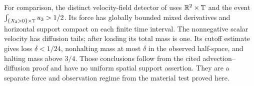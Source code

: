 \begin{remark}
For comparison, the distinct velocity-field detector of
\cite[Theorem~1.1(2) and Section~5]{OpenAI379EulerianC} uses
$\mathbb R^2\times\mathbb T$ and the event
$\int_{\{X_2>0\}\times\mathbb T}u_3>1/2$. Its force has globally bounded
mixed derivatives and horizontal support compact on each finite time
interval. The nonnegative scalar velocity has diffusion tails; after
loading its total mass is one. Its cutoff estimate gives loss
$\delta<1/24$, nonhalting mass at most $\delta$ in the observed half-space,
and halting mass above $3/4$. Those conclusions follow from the cited
advection--diffusion proof and have no uniform spatial support assertion.
They are a separate force and observation regime from the material test
proved here.
\end{remark}
